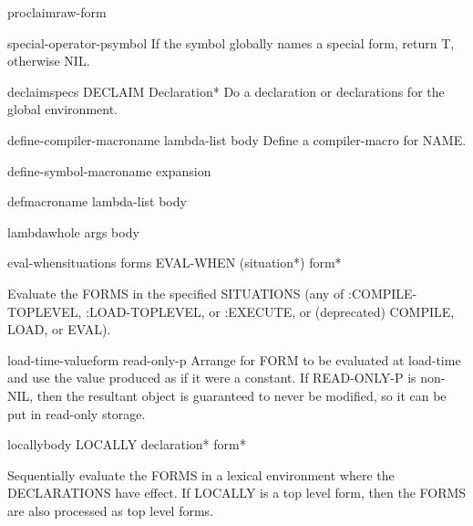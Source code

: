 \documentclass[10pt,english]{book}
\begin{document}
\begin{function}{proclaim}{raw-form}
  
\end{function}

\begin{function}{special-operator-p}{symbol}
  If the symbol globally names a special form, return T, otherwise NIL.
\end{function}

\begin{macro}{declaim}{\rest specs}
  DECLAIM Declaration*
  Do a declaration or declarations for the global environment.
\end{macro}

\begin{macro}{define-compiler-macro}{name lambda-list \body body}
  Define a compiler-macro for NAME.
\end{macro}

\begin{macro}{define-symbol-macro}{name expansion}
  
\end{macro}

\begin{macro}{defmacro}{name lambda-list \rest body}
  
\end{macro}

\begin{macro}{lambda}{\whole whole args \body body}
  
\end{macro}

\begin{specialop}{eval-when}{situations \rest forms}
  EVAL-WHEN (situation*) form*

Evaluate the FORMS in the specified SITUATIONS (any of :COMPILE-TOPLEVEL,
:LOAD-TOPLEVEL, or :EXECUTE, or (deprecated) COMPILE, LOAD, or EVAL).
\end{specialop}

\begin{specialop}{load-time-value}{form \op read-only-p}
  Arrange for FORM to be evaluated at load-time and use the value produced
   as if it were a constant. If READ-ONLY-P is non-NIL, then the resultant
   object is guaranteed to never be modified, so it can be put in read-only
   storage.
\end{specialop}

\begin{specialop}{locally}{\body body}
  LOCALLY declaration* form*

Sequentially evaluate the FORMS in a lexical environment where the
DECLARATIONS have effect. If LOCALLY is a top level form, then the FORMS are
also processed as top level forms.
\end{specialop}
\end{document}
